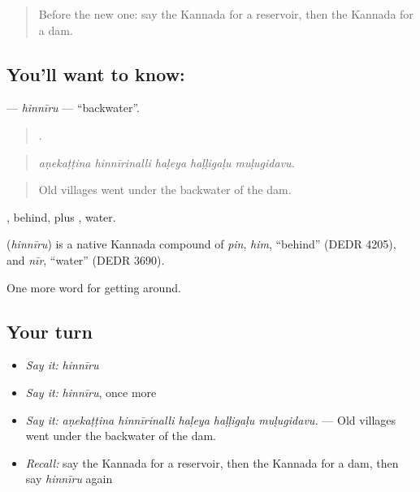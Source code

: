 \label{lesson:KA-C483-hinniru}



\begin{quote}
Before the new one: say the Kannada for a reservoir, then the Kannada for a dam.
\end{quote}

\subsection*{You'll want to know: }
\textbf{} — \emph{hinnīru} — \textquotedblleft{}backwater\textquotedblright{}.

\begin{quote}
    .
\end{quote}

\begin{quote}
\emph{aṇekaṭṭina hinnīrinalli haḷeya haḷḷigaḷu muḷugidavu.}
\end{quote}

\begin{quote}
Old villages went under the backwater of the dam.
\end{quote}

, behind, plus , water.

\begin{cousinweb}
\textbf{} (\emph{hinnīru}) is a native Kannada compound of \emph{pin}, \emph{him}, \textquotedblleft{}behind\textquotedblright{} (DEDR 4205), and \emph{nīr}, \textquotedblleft{}water\textquotedblright{} (DEDR 3690).
\end{cousinweb}

\begin{grammarlens}[title={What you've built}]
One more word for getting around.
\end{grammarlens}

\subsection*{Your turn}
\begin{itemize}
\raggedright
  \item \emph{Say it:} \emph{hinnīru}
  \item \emph{Say it:} \emph{hinnīru}, once more
  \item \emph{Say it:} \emph{aṇekaṭṭina hinnīrinalli haḷeya haḷḷigaḷu muḷugidavu.} — Old villages went under the backwater of the dam.
  \item \emph{Recall:} say the Kannada for a reservoir, then the Kannada for a dam, then say \emph{hinnīru} again
\end{itemize}

